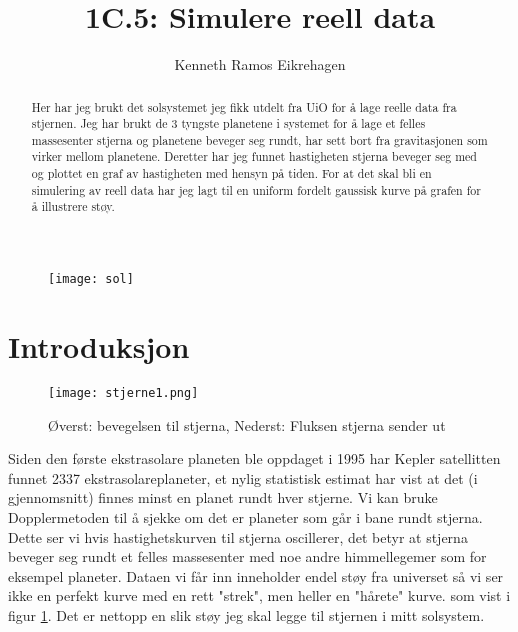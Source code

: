 \documentclass[12pt,preprint]{aastex6}
\begin{document}
\title{1C.5: Simulere reell data}

\author{Kenneth Ramos Eikrehagen}

\begin{figure}
\texttt{[image: sol]}
\end{figure}

\newpage

\begin{abstract}
Her har jeg brukt det solsystemet jeg fikk utdelt fra UiO for å lage reelle data fra stjernen. Jeg har brukt de 3 tyngste planetene i systemet for å lage et felles massesenter stjerna og planetene beveger seg rundt, har sett bort fra gravitasjonen som virker mellom planetene. Deretter har jeg funnet hastigheten stjerna beveger seg med og plottet en graf av hastigheten med hensyn på tiden. For at det skal bli en simulering av reell data har jeg lagt til en uniform fordelt gaussisk kurve på grafen for å illustrere støy. 
\end{abstract}

\section{Introduksjon}
\label{sect:intro}
\begin{wrapfigure}{r}{0.4\textwidth}
\begin{center}
\texttt{[image: stjerne1.png]}
\end{center}
\caption{Øverst: bevegelsen til stjerna, Nederst: Fluksen stjerna sender ut}
\label{1}
\end{wrapfigure}
Siden den første ekstrasolare planeten ble oppdaget i 1995 har Kepler satellitten funnet 2337 ekstrasolareplaneter, et nylig statistisk estimat har vist at det (i gjennomsnitt) finnes minst en planet rundt hver stjerne. Vi kan bruke Dopplermetoden til å sjekke om det er planeter som går i bane rundt stjerna. Dette ser vi hvis hastighetskurven til stjerna oscillerer, det betyr at stjerna beveger seg rundt et felles massesenter med noe andre himmellegemer som for eksempel planeter. Dataen vi får inn inneholder endel støy fra universet så vi ser ikke en perfekt kurve med en rett "strek", men heller en "hårete" kurve. som vist i figur \ref{1}. Det er nettopp en slik støy jeg skal legge til stjernen i mitt solsystem. 
\\
\end{document}
